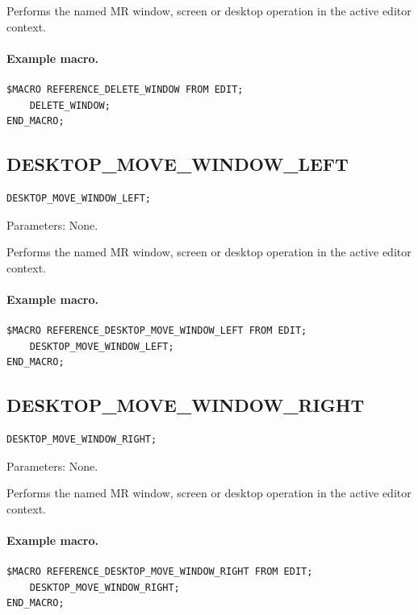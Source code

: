 \documentclass[a4paper,10pt,twoside,openany]{book}
\newenvironment{mrmacextension}{\begin{changebar}}{\end{changebar}}
\begin{document}
Performs the named MR window, screen or desktop operation in the active editor context.

\paragraph{Example macro.}
\begin{verbatim}
$MACRO REFERENCE_DELETE_WINDOW FROM EDIT;
    DELETE_WINDOW;
END_MACRO;
\end{verbatim}

\begin{mrmacextension}
\label{prim:procedure-desktop-move-window-left}
\subsection*{DESKTOP\_MOVE\_WINDOW\_LEFT}
\begin{verbatim}
DESKTOP_MOVE_WINDOW_LEFT;
\end{verbatim}
Parameters: None.

Performs the named MR window, screen or desktop operation in the active editor context.

\paragraph{Example macro.}
\begin{verbatim}
$MACRO REFERENCE_DESKTOP_MOVE_WINDOW_LEFT FROM EDIT;
    DESKTOP_MOVE_WINDOW_LEFT;
END_MACRO;
\end{verbatim}
\end{mrmacextension}

\begin{mrmacextension}
\label{prim:procedure-desktop-move-window-right}
\subsection*{DESKTOP\_MOVE\_WINDOW\_RIGHT}
\begin{verbatim}
DESKTOP_MOVE_WINDOW_RIGHT;
\end{verbatim}
Parameters: None.

Performs the named MR window, screen or desktop operation in the active editor context.

\paragraph{Example macro.}
\begin{verbatim}
$MACRO REFERENCE_DESKTOP_MOVE_WINDOW_RIGHT FROM EDIT;
    DESKTOP_MOVE_WINDOW_RIGHT;
END_MACRO;
\end{verbatim}
\end{mrmacextension}
\end{document}
